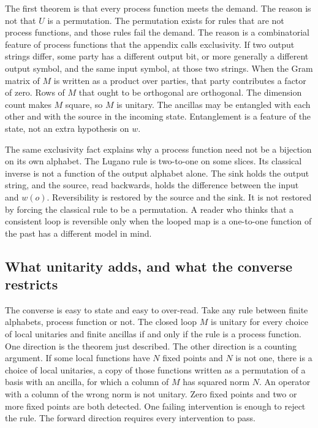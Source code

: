 \documentclass[11pt]{article}
\begin{document}
The first theorem is that every process function meets the demand. The reason is not that \(U\) is a permutation. The permutation exists for rules that are not process functions, and those rules fail the demand. The reason is a combinatorial feature of process functions that the appendix calls exclusivity. If two output strings differ, some party has a different output bit, or more generally a different output symbol, and the same input symbol, at those two strings. When the Gram matrix of \(M\) is written as a product over parties, that party contributes a factor of zero. Rows of \(M\) that ought to be orthogonal are orthogonal. The dimension count makes \(M\) square, so \(M\) is unitary. The ancillas may be entangled with each other and with the source in the incoming state. Entanglement is a feature of the state, not an extra hypothesis on \(w\).

The same exclusivity fact explains why a process function need not be a bijection on its own alphabet. The Lugano rule is two-to-one on some slices. Its classical inverse is not a function of the output alphabet alone. The sink holds the output string, and the source, read backwards, holds the difference between the input and \(w(o)\). Reversibility is restored by the source and the sink. It is not restored by forcing the classical rule to be a permutation. A reader who thinks that a consistent loop is reversible only when the looped map is a one-to-one function of the past has a different model in mind.

\subsection{What unitarity adds, and what the converse restricts}
\label{sec:iff}

The converse is easy to state and easy to over-read. Take any rule between finite alphabets, process function or not. The closed loop \(M\) is unitary for every choice of local unitaries and finite ancillas if and only if the rule is a process function. One direction is the theorem just described. The other direction is a counting argument. If some local functions have \(N\) fixed points and \(N\) is not one, there is a choice of local unitaries, a copy of those functions written as a permutation of a basis with an ancilla, for which a column of \(M\) has squared norm \(N\). An operator with a column of the wrong norm is not unitary. Zero fixed points and two or more fixed points are both detected. One failing intervention is enough to reject the rule. The forward direction requires every intervention to pass.
\end{document}
